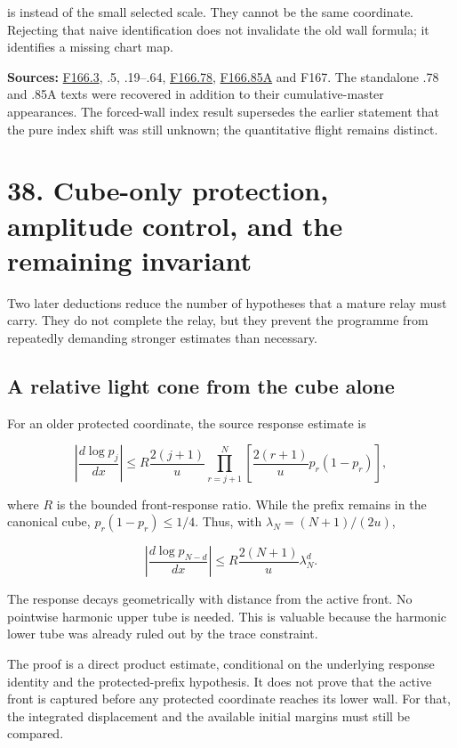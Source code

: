 \documentclass[
  10pt,
  a4paper,
  10pt,
  oneside,
  openany]{book}
\begin{document}
is instead of the small selected scale. They cannot be the same
coordinate. Rejecting that naive identification does not invalidate the
old wall formula; it identifies a missing chart map.

\textbf{Sources:} \hyperref[source-f166-3]{F166.3}, .5, .19--.64,
\hyperref[source-f166-78]{F166.78}, \hyperref[source-f166-85a]{F166.85A}
and F167. The standalone .78 and .85A texts were recovered in addition
to their cumulative-master appearances. The forced-wall index result
supersedes the earlier statement that the pure index shift was still
unknown; the quantitative flight remains distinct.

\section{38. Cube-only protection, amplitude control, and the remaining
invariant}\label{ch-relay-continuation}

Two later deductions reduce the number of hypotheses that a mature relay
must carry. They do not complete the relay, but they prevent the
programme from repeatedly demanding stronger estimates than necessary.

\subsection{A relative light cone from the cube
alone}\label{a-relative-light-cone-from-the-cube-alone}

For an older protected coordinate, the source response estimate is

\[
 \left|\frac{d\log p_j}{dx}\right|
 \le R\frac{2(j+1)}u
 \prod_{r=j+1}^N
 \left[\frac{2(r+1)}u p_r(1-p_r)\right],
 \tag{38.1}\label{eq:38.1}
\]

where \(R\) is the bounded front-response ratio. While the prefix
remains in the canonical cube, \(p_r(1-p_r)\le1/4\). Thus, with
\(\lambda_N=(N+1)/(2u)\),

\[
 \left|\frac{d\log p_{N-d}}{dx}\right|
 \le R\frac{2(N+1)}u\lambda_N^d.
 \tag{38.2}\label{eq:38.2}
\]

The response decays geometrically with distance from the active front.
No pointwise harmonic upper tube is needed. This is valuable because the
harmonic lower tube was already ruled out by the trace constraint.

The proof is a direct product estimate, conditional on the underlying
response identity and the protected-prefix hypothesis. It does not prove
that the active front is captured before any protected coordinate
reaches its lower wall. For that, the integrated displacement and the
available initial margins must still be compared.
\end{document}
